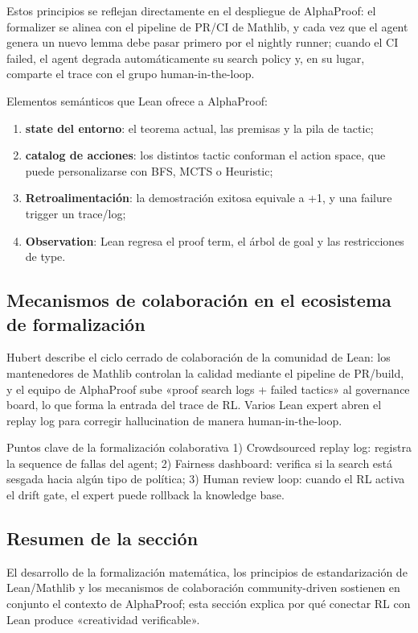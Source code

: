 Estos principios se reflejan directamente en el despliegue de AlphaProof: el formalizer se alinea con el pipeline de PR/CI de Mathlib, y cada vez que el agent genera un nuevo lemma debe pasar primero por el nightly runner; cuando el CI failed, el agent degrada automáticamente su search policy y, en su lugar, comparte el trace con el grupo human-in-the-loop.

Elementos semánticos que Lean ofrece a AlphaProof:
\begin{enumerate}
    \item \textbf{state del entorno}: el teorema actual, las premisas y la pila de tactic;
    \item \textbf{catalog de acciones}: los distintos tactic conforman el action space, que puede personalizarse con BFS, MCTS o Heuristic;
    \item \textbf{Retroalimentación}: la demostración exitosa equivale a +1, y una failure trigger un trace/log;
    \item \textbf{Observation}: Lean regresa el proof term, el árbol de goal y las restricciones de type.
\end{enumerate}

\subsection{Mecanismos de colaboración en el ecosistema de formalización}
Hubert describe el ciclo cerrado de colaboración de la comunidad de Lean: los mantenedores de Mathlib controlan la calidad mediante el pipeline de PR/build, y el equipo de AlphaProof sube «proof search logs + failed tactics» al governance board, lo que forma la entrada del trace de RL. Varios Lean expert abren el replay log para corregir hallucination de manera human-in-the-loop.

\begin{knowledgebox}{Puntos clave de la formalización colaborativa}
1) Crowdsourced replay log: registra la sequence de fallas del agent; 2) Fairness dashboard: verifica si la search está sesgada hacia algún tipo de política; 3) Human review loop: cuando el RL activa el drift gate, el expert puede rollback la knowledge base.
\end{knowledgebox}

\subsection{Resumen de la sección}
El desarrollo de la formalización matemática, los principios de estandarización de Lean/Mathlib y los mecanismos de colaboración community-driven sostienen en conjunto el contexto de AlphaProof; esta sección explica por qué conectar RL con Lean produce «creatividad verificable».
\newpage

